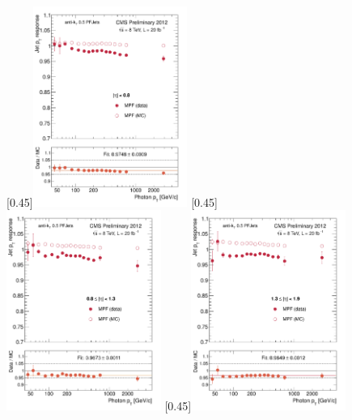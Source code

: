 \begin{figure}[p!]
    \centering
    \subcaptionbox{\label{fig:mpf_eta008}}[0.45\textwidth]{\includegraphics[width=0.45\textwidth]{chapitre4/figs/resp_mpf/response_eta008_mpf.pdf}}\hfill
    \subcaptionbox{\label{fig:mpf_eta0813}}[0.45\textwidth]{\includegraphics[width=0.45\textwidth]{chapitre4/figs/resp_mpf/response_eta0813_mpf.pdf}}
    \subcaptionbox{\label{fig:mpf_eta1319}}[0.45\textwidth]{\includegraphics[width=0.45\textwidth]{chapitre4/figs/resp_mpf/response_eta1319_mpf.pdf}}\hfill

\end{figure}
